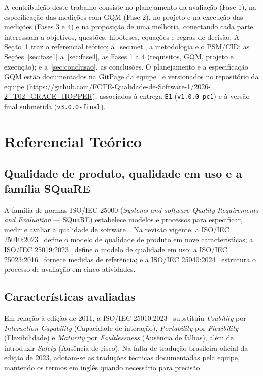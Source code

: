 \documentclass[conference]{model/IEEEtran}%
\begin{document}
A contribuição deste trabalho consiste no planejamento da avaliação (Fase 1), na especificação das medições com GQM (Fase 2), no projeto e na execução das medições (Fases 3 e 4) e na proposição de uma melhoria, conectando cada parte interessada a objetivos, questões, hipóteses, equações e regras de decisão. A Seção~\ref{sec:ref} traz o referencial teórico; a~\ref{sec:met}, a metodologia e o PSM/CID; as Seções~\ref{sec:fase1} a~\ref{sec:fase4}, as Fases 1 a 4 (requisitos, GQM, projeto e execução); e a~\ref{sec:conclusao}, as conclusões. O planejamento e a especificação GQM estão documentados na GitPage da equipe~\cite{gracehopper_gqm,gracehopper_pc1} e versionados no repositório da equipe (\url{https://github.com/FCTE-Qualidade-de-Software-1/2026-2_T02_GRACE_HOPPER}), associados à entrega \texttt{E1} (\texttt{v1.0.0-pc1}) e à versão final submetida (\texttt{v3.0.0-final}).

\section{Referencial Teórico}\label{sec:ref}

\subsection{Qualidade de produto, qualidade em uso e a família SQuaRE}
A família de normas ISO/IEC 25000 (\textit{Systems and software Quality Requirements and Evaluation} --- SQuaRE) estabelece modelos e processos para especificar, medir e avaliar a qualidade de software~\cite{iso25002}. Na revisão vigente, a ISO/IEC 25010:2023~\cite{iso25010} define o modelo de qualidade de produto em nove características; a ISO/IEC 25019:2023~\cite{iso25019} define o modelo de qualidade em uso; a ISO/IEC 25023:2016~\cite{iso25023} fornece medidas de referência; e a ISO/IEC 25040:2024~\cite{iso25040} estrutura o processo de avaliação em cinco atividades.

\subsection{Características avaliadas}
Em relação à edição de 2011, a ISO/IEC 25010:2023~\cite{iso25010} substituiu \textit{Usability} por \textit{Interaction Capability} (Capacidade de interação), \textit{Portability} por \textit{Flexibility} (Flexibilidade) e \textit{Maturity} por \textit{Faultlessness} (Ausência de falhas), além de introduzir \textit{Safety} (Ausência de risco). Na falta de tradução brasileira oficial da edição de 2023, adotam-se as traduções técnicas documentadas pela equipe, mantendo os termos em inglês quando necessário para precisão.
\end{document}
